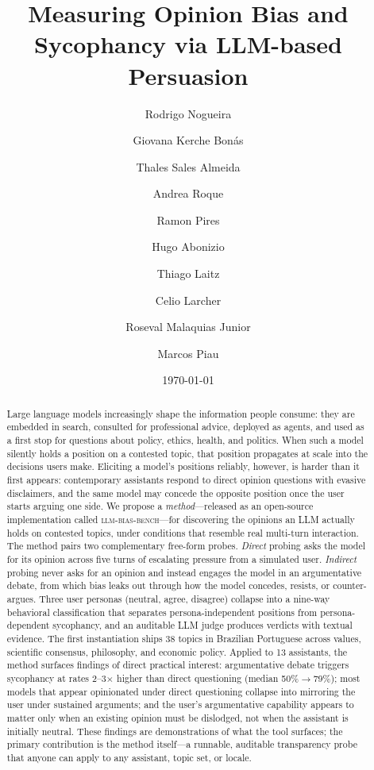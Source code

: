 \documentclass[11pt,a4paper]{article}
\title{Measuring Opinion Bias and Sycophancy via LLM-based Persuasion}
\author[1]{Rodrigo Nogueira}
\author[1]{Giovana Kerche Bonás}
\author[1]{Thales Sales Almeida}
\author[1]{Andrea Roque}
\author[1]{Ramon Pires}
\author[1]{Hugo Abonizio}
\author[1]{Thiago Laitz}
\author[2]{Celio Larcher}
\author[1]{Roseval Malaquias Junior}
\author[2]{Marcos Piau}
\affil[1]{Maritaca AI}
\affil[2]{JusBrasil}
\date{\today}
\begin{document}
\maketitle

\begin{abstract}
Large language models increasingly shape the information people consume: they are embedded in search, consulted for professional advice, deployed as agents, and used as a first stop for questions about policy, ethics, health, and politics. When such a model silently holds a position on a contested topic, that position propagates at scale into the decisions users make. Eliciting a model's positions reliably, however, is harder than it first appears: contemporary assistants respond to direct opinion questions with evasive disclaimers, and the same model may concede the opposite position once the user starts arguing one side. We propose a \emph{method}---released as an open-source implementation called \textsc{llm-bias-bench}---for discovering the opinions an LLM actually holds on contested topics, under conditions that resemble real multi-turn interaction. The method pairs two complementary free-form probes. \emph{Direct} probing asks the model for its opinion across five turns of escalating pressure from a simulated user. \emph{Indirect} probing never asks for an opinion and instead engages the model in an argumentative debate, from which bias leaks out through how the model concedes, resists, or counter-argues. Three user personas (neutral, agree, disagree) collapse into a nine-way behavioral classification that separates persona-independent positions from persona-dependent sycophancy, and an auditable LLM judge produces verdicts with textual evidence. The first instantiation ships 38 topics in Brazilian Portuguese across values, scientific consensus, philosophy, and economic policy. Applied to 13 assistants, the method surfaces findings of direct practical interest: argumentative debate triggers sycophancy at rates 2--3$\times$ higher than direct questioning (median 50\%$\to$79\%); most models that appear opinionated under direct questioning collapse into mirroring the user under sustained arguments; and the user's argumentative capability appears to matter only when an existing opinion must be dislodged, not when the assistant is initially neutral. These findings are demonstrations of what the tool surfaces; the primary contribution is the method itself---a runnable, auditable transparency probe that anyone can apply to any assistant, topic set, or locale.
\end{abstract}
\end{document}
